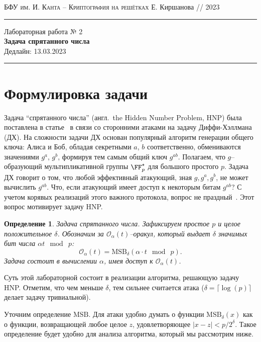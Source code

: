 \documentclass[11pt]{exam}
\newtheorem{definition}[theorem]{Определение}
\theoremstyle{definition}
\newcommand{\bigO}{\mathcal{O}}
\begin{document}
	{\noindent
		\textsc{БФУ им. И. Канта -- Криптография на решётках}
		\hfill {Е. Киршанова // 2023}
\hrule
\begin{center}
	{\LARGE
			Лабораторная работа № 2 \\[5pt]
			\textbf{
				Задача спрятанного числа 
			} \\[10pt]
	 	{Дедлайн: 13.03.2023} 
 	} 
\end{center}
\hrule \vspace{5mm}
	
	\thispagestyle{empty}
	
	\vspace{0.2cm}
	\section{Формулировка задачи}
	Задача ``спрятанного числа'' (англ.\ the Hidden Number Problem, HNP) была поставлена в статье~\cite{BV} в связи со сторонними атаками на задачу Диффи-Хэллмана (ДХ). На сложности задачи ДХ основан популярный алгоритм генерации общего ключа: Алиса и Боб, обладая секретными $a$, $b$ соответственно, обмениваются значениями $g^a$, $g^b$, формируя тем самым общий ключ $g^{ab}$. Полагаем, что $g$–образующий мультипликативной группы $\FF_p^\star$ для большого простого $p$. Задача ДХ говорит о том, что любой эффективный атакующий, зная $g,g^a,g^b$, не может вычислить $g^{ab}$. Что, если атакующий имеет доступ к некоторым битам $g^{ab}$? С учетом корявых реализаций этого важного протокола, вопрос не праздный~\cite{MB+}. Этот вопрос мотивирует задачу HNP.
	\begin{definition}
	 Задача спрятанного числа. Зафиксируем простое $p$ и целое положительное $\delta$. Обозначим за $\bigO_\alpha(t)$–оракул, который выдает $\delta$ значимых бит числа $\alpha t~\bmod~p$:
	 \[
	 	\bigO_\alpha(t) = \mathrm{MSB}_{\delta}(\alpha \cdot t~\bmod~p).
	 \]
	Задача состоит в вычислении $\alpha$, имея доступ к $\bigO_\alpha(t)$.
	\end{definition}

	Суть этой лабораторной состоит в реализации алгоритма, решающую задачу HNP. Отметим, что чем меньше $\delta$, тем сильнее считается атака ($\delta = \lceil \log(p)\rceil$ делает задачу тривиальной).
	
	Уточним определение $\mathrm{MSB}$. Для атаки удобно думать о функции $\mathrm{MSB}_{\delta}(x)$ как о функции, возвращающей любое целое $z$, удовлетворяющее $|x-z| < p/2^\delta$. Такое определение будет удобно для анализа алгоритма, который мы рассмотрим ниже.
	
}
\end{document}
